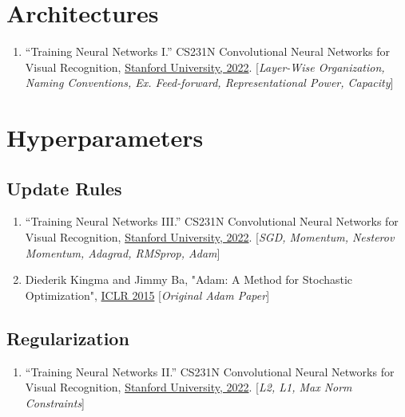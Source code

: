 \documentclass[12pt]{article}
\begin{document}
\section{Architectures}
\begin{enumerate}
    \item “Training Neural Networks I.” 
    CS231N Convolutional Neural Networks for Visual Recognition, 
    \href{https://cs231n.github.io/neural-networks-1/#nn}{Stanford University, 2022}.
    [\emph{Layer-Wise Organization, Naming Conventions, Ex. Feed-forward, 
    Representational Power, Capacity}]
\end{enumerate}

\section{Hyperparameters}
\subsection{Update Rules}
\begin{enumerate}
    \item “Training Neural Networks III.” 
    CS231N Convolutional Neural Networks for Visual Recognition, 
    \href{https://cs231n.github.io/neural-networks-3/#update}{Stanford University, 2022}. 
    [\emph{SGD, Momentum, Nesterov Momentum, Adagrad, RMSprop, Adam}]

    \item Diederik Kingma and Jimmy Ba, 
    "Adam: A Method for Stochastic Optimization", 
    \href{https://arxiv.org/abs/1412.6980}{ICLR 2015}
    [\emph{Original Adam Paper}]
\end{enumerate}

\subsection{Regularization}
\begin{enumerate}
    \item “Training Neural Networks II.” 
    CS231N Convolutional Neural Networks for Visual Recognition, 
    \href{https://cs231n.github.io/neural-networks-2/#reg}{Stanford University, 2022}. 
    [\emph{L2, L1, Max Norm Constraints}]
\end{enumerate}
\end{document}
